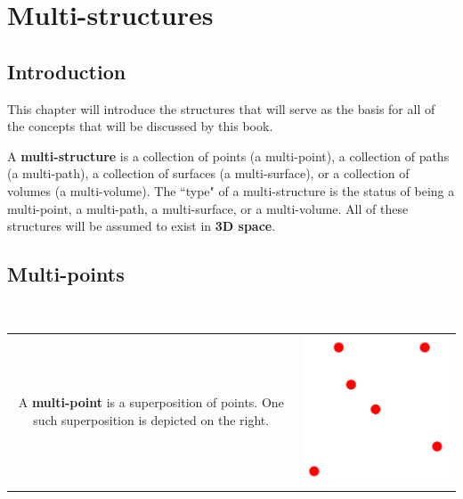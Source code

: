 


\chapter{Multi-structures}\label{chap:multi-structures}

\section{Introduction}

This chapter will introduce the structures that will serve as the basis for all of the concepts that will be discussed by this book. 

A \textbf{multi-structure} is a collection of points (a multi-point), a collection of paths (a multi-path), a collection of surfaces (a multi-surface), or a collection of volumes (a multi-volume). The ``type" of a multi-structure is the status of being a multi-point, a multi-path, a multi-surface, or a multi-volume. All of these structures will be assumed to exist in {\bf 3D space}.


\section{Multi-points}

~

\begin{tabular}{cc}
\parbox{0.5\textwidth}{
A \textbf{multi-point} is a superposition of points. One such superposition is depicted on the right.
} & \parbox{0.5\textwidth}{
\includegraphics[scale = 0.75]{Multi-structures/Multipoints/multi-point_simple}
}
\end{tabular}

